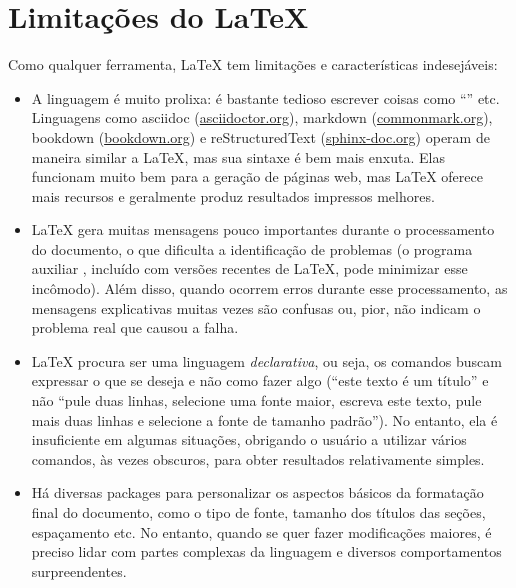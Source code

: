 \section{Limitações do \LaTeX{}}
\label{sec:limitations}

Como qualquer ferramenta, \LaTeX{} tem limitações e características
indesejáveis:

\begin{itemize}
    \item A linguagem é muito prolixa: é bastante tedioso escrever
    coisas como ``'' etc.
    Linguagens como asciidoc (\url{asciidoctor.org}), markdown
    (\url{commonmark.org}), bookdown (\url{bookdown.org}) e reStructuredText
    (\url{sphinx-doc.org}) operam de maneira similar a \LaTeX{}, mas sua
    sintaxe é bem mais enxuta. Elas funcionam muito bem para a geração de
    páginas web, mas \LaTeX{} oferece mais recursos e geralmente produz
    resultados impressos melhores.

    \item \LaTeX{} gera muitas mensagens pouco importantes durante
    o processamento do documento, o que dificulta a identificação
    de problemas (o programa auxiliar , incluído
    com versões recentes de \LaTeX{}, pode minimizar esse incômodo).
    Além disso, quando ocorrem erros durante esse processamento, as
    mensagens explicativas muitas vezes são confusas ou, pior, não
    indicam o problema real que causou a falha.

    \item \LaTeX{} procura ser uma linguagem \emph{declarativa}, ou seja,
    os comandos buscam expressar o que se deseja e não como fazer algo
    (``este texto é um título'' e não ``pule duas linhas, selecione uma
    fonte maior, escreva este texto, pule mais duas linhas e selecione a
    fonte de tamanho padrão''). No entanto, ela é insuficiente em algumas
    situações, obrigando o usuário a utilizar vários comandos, às vezes
    obscuros, para obter resultados relativamente simples.

    \item Há diversas packages para personalizar os aspectos básicos
    da formatação final do documento, como o tipo de fonte, tamanho dos
    títulos das seções, espaçamento etc. No entanto, quando se quer
    fazer modificações maiores, é preciso lidar com partes complexas da
    linguagem e diversos comportamentos surpreendentes.


\end{itemize}
